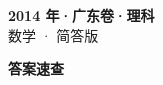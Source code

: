 \documentclass[zihao=-4, a4paper]{ctexart}
\begin{document}
\begin{center}
  {\Large\bfseries 2014 年·广东卷·理科}\\[4pt]
  {\large 数学 · 简答版}
\end{center}
\medskip
{}

\clearpage
{}
\begin{center}{\Large\bfseries 答案速查}\end{center}
\medskip

\end{document}
